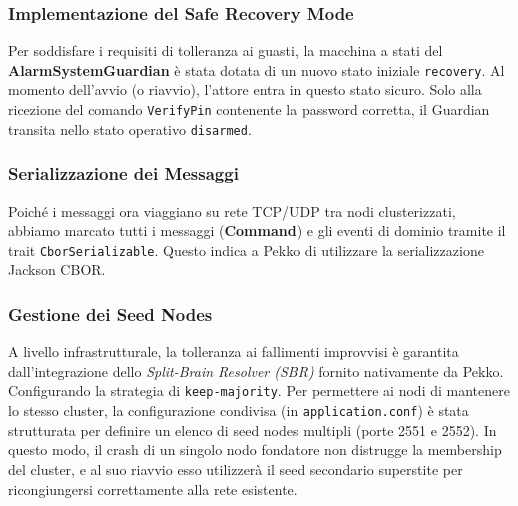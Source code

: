 \subsubsection{Implementazione del Safe Recovery Mode}
Per soddisfare i requisiti di tolleranza ai guasti, la macchina a stati del \textbf{AlarmSystemGuardian} è stata dotata di un nuovo stato iniziale \texttt{recovery}.
Al momento dell'avvio (o riavvio), l'attore entra in questo stato sicuro.
Solo alla ricezione del comando \texttt{VerifyPin} contenente la password corretta, il Guardian transita nello stato operativo \texttt{disarmed}.

\subsubsection{Serializzazione dei Messaggi}
Poiché i messaggi ora viaggiano su rete TCP/UDP tra nodi clusterizzati, abbiamo marcato tutti i messaggi (\textbf{Command}) e gli eventi di dominio tramite il trait \texttt{CborSerializable}. Questo indica a Pekko di utilizzare la serializzazione Jackson CBOR.

\subsubsection{Gestione dei Seed Nodes}
A livello infrastrutturale, la tolleranza ai fallimenti improvvisi è garantita dall'integrazione dello \textit{Split-Brain Resolver (SBR)} fornito nativamente da Pekko. Configurando la strategia di \texttt{keep-majority}.
Per permettere ai nodi di mantenere lo stesso cluster, la configurazione condivisa (in \texttt{application.conf}) è stata strutturata per definire un elenco di seed nodes multipli (porte 2551 e 2552). In questo modo, il crash di un singolo nodo fondatore non distrugge la membership del cluster, e al suo riavvio esso utilizzerà il seed secondario superstite per ricongiungersi correttamente alla rete esistente.